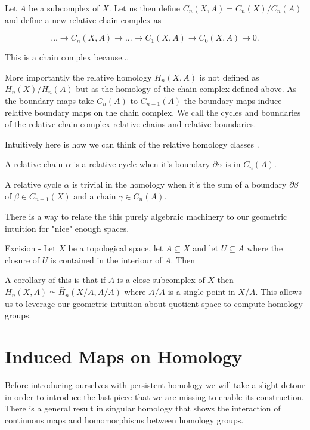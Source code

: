 Let $A$ be a subcomplex of $X$. Let us then define $C_n(X, A) = C_n(X) / C_n(A)$ and define a new relative chain complex as

$$ ... \longrightarrow C_n(X, A) \longrightarrow ... \longrightarrow C_1(X, A) \longrightarrow C_0(X, A) \longrightarrow 0. $$

This is a chain complex because...

More importantly the relative homology $H_n(X, A)$ is not defined as $H_n(X) / H_n(A)$ but as the homology of the chain complex defined above. As the boundary maps take $C_n(A)$ to $C_{n-1}(A)$ the boundary maps induce relative boundary maps on the chain complex. We call the cycles and boundaries of the relative chain complex relative chains and relative boundaries.

Intuitively here is how we can think of the relative homology classes \cite{algebraic-topology}.

A relative chain $\alpha$ is a relative cycle when it's boundary $\partial\alpha $ is in $C_n(A)$.

A relative cycle $\alpha$ is trivial in the homology when it's the sum of a boundary $\partial \beta$ of $\beta \in C_{n+1}(X)$ and a chain $\gamma \in C_n(A)$.

There is a way to relate the this purely algebraic machinery to our geometric intuition for "nice" enough spaces.




\begin{thm} Excision - Let $X$ be a topological space, let $A \subseteq X$ and let $U \subseteq A$ where the closure of $U$ is contained in the interiour of $A$. Then   \end{thm}


A corollary of this is that if $A$ is a close subcomplex of $X$ then $H_n(X, A) \simeq \overset{\sim}{H}_n(X/A, A/A)$ where $A/A$ is a single point in $X/A$. This allows us to leverage our geometric intuition about quotient space to compute homology groups.

\section{Induced Maps on Homology}

Before introducing ourselves with persistent homology we will take a slight detour in order to introduce the last piece that we are missing to enable its construction. There is a general result in singular homology that shows the interaction of continuous maps and homomorphisms between homology groups.

